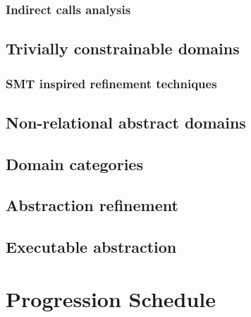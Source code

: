 \subsubsection{Indirect calls analysis}

\subsection{Trivially constrainable domains}

\subsubsection{SMT inspired refinement techniques}




\subsection{Non-relational abstract domains}


\subsection{ Domain categories }






\subsection{Abstraction refinement}






\subsection{ Executable abstraction }


\section{Progression Schedule}
